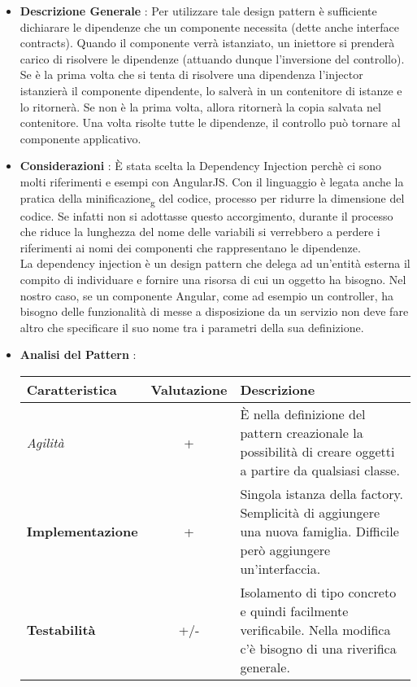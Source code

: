 {{{			\begin{itemize}\itemsep1pt
				\item \textbf{Descrizione Generale} : Per utilizzare tale design pattern è sufficiente dichiarare le dipendenze che un componente necessita (dette anche interface contracts). Quando il componente verrà istanziato, un iniettore si prenderà carico di risolvere le dipendenze (attuando dunque l'inversione del controllo). Se è la prima volta che si tenta di risolvere una dipendenza l'injector istanzierà il componente dipendente, lo salverà in un contenitore di istanze e lo ritornerà. Se non è la prima volta, allora ritornerà la copia salvata nel contenitore. Una volta risolte tutte le dipendenze, il controllo può tornare al componente applicativo.
				\item \textbf{Considerazioni} : È stata scelta la Dependency Injection perchè ci sono molti riferimenti e esempi con AngularJS. Con il linguaggio è legata anche la pratica della minificazione\textsubscript{g} del codice, processo per ridurre la dimensione del codice. Se infatti non si adottasse questo accorgimento, durante il processo che riduce la lunghezza del nome delle variabili si verrebbero a perdere i riferimenti ai nomi dei componenti che rappresentano le dipendenze.\\
				La dependency injection è un design pattern che delega ad un’entità esterna il compito di individuare e fornire una risorsa di cui un oggetto ha bisogno. Nel nostro caso, se un componente Angular, come ad esempio un controller, ha bisogno delle funzionalità di messe a disposizione da un servizio non deve fare altro che specificare il suo nome tra i parametri della sua definizione.
				\item \textbf{Analisi del Pattern} : %
				\small %
				{\renewcommand\arraystretch{1.2} %
					\begin{tabular}{|l|c|l|}
						\hline
						{\textbf{Caratteristica}}&{\textbf{Valutazione}}&{\textbf{Descrizione}}\\
						\hline
						\textit{Agilità} & + & È nella definizione del pattern creazionale la possibilità di creare oggetti a partire da qualsiasi classe. \\
						\hline
						\textbf{Implementazione} & + & Singola istanza della factory. Semplicità di aggiungere una nuova famiglia. Difficile però aggiungere un'interfaccia. \\
						\hline
						\textbf{Testabilità} & +/- & Isolamento di tipo concreto e quindi facilmente verificabile. Nella modifica c'è bisogno di una riverifica generale. \\

\end{tabular}}
\end{itemize}}}}
